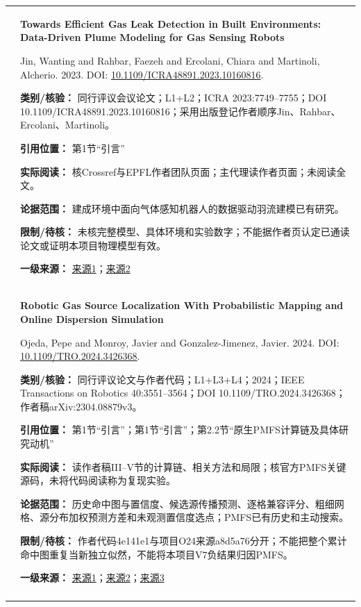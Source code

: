 \begin{longtable}{@{}>{\raggedright\arraybackslash}p{0.7cm}>{\raggedright\arraybackslash}p{14.8cm}@{}}
9 & \textbf{Towards Efficient Gas Leak Detection in Built Environments: Data-Driven Plume Modeling for Gas Sensing Robots}\par Jin, Wanting and Rahbar, Faezeh and Ercolani, Chiara and Martinoli, Alcherio. 2023. DOI: \url{10.1109/ICRA48891.2023.10160816}. \par\textbf{类别/核验：} 同行评议会议论文；L1+L2；ICRA 2023:7749–7755；DOI 10.1109/ICRA48891.2023.10160816；采用出版登记作者顺序Jin、Rahbar、Ercolani、Martinoli。\par\textbf{引用位置：} 第1节“引言”\par\textbf{实际阅读：} 核Crossref与EPFL作者团队页面；主代理读作者页面；未阅读全文。\par\textbf{论据范围：} 建成环境中面向气体感知机器人的数据驱动羽流建模已有研究。\par\textbf{限制/待核：} 未核完整模型、具体环境和实验数字；不能据作者页认定已通读论文或证明本项目物理模型有效。\par\textbf{一级来源：} \href{https://doi.org/10.1109/ICRA48891.2023.10160816}{来源1}；\href{https://www.epfl.ch/labs/disal/research/gassensingstructure/}{来源2} \\\addlinespace[6pt]
10 & \textbf{Robotic Gas Source Localization With Probabilistic Mapping and Online Dispersion Simulation}\par Ojeda, Pepe and Monroy, Javier and Gonzalez-Jimenez, Javier. 2024. DOI: \url{10.1109/TRO.2024.3426368}. \par\textbf{类别/核验：} 同行评议论文与作者代码；L1+L3+L4；2024；IEEE Transactions on Robotics 40:3551–3564；DOI 10.1109/TRO.2024.3426368；作者稿arXiv:2304.08879v3。\par\textbf{引用位置：} 第1节“引言”；第1节“引言”；第2.2节“原生PMFS计算链及具体研究动机”\par\textbf{实际阅读：} 读作者稿III–V节的计算链、相关方法和局限；核官方PMFS关键源码，未将代码阅读称为复现实验。\par\textbf{论据范围：} 历史命中图与置信度、候选源传播预测、逐格兼容评分、粗细网格、源分布加权预测方差和未观测置信度选点；PMFS已有历史和主动搜索。\par\textbf{限制/待核：} 作者代码4e141e1与项目O24来源a8d5a76分开；不能把整个累计命中图重复当新独立似然，不能将本项目V7负结果归因PMFS。\par\textbf{一级来源：} \href{https://arxiv.org/html/2304.08879v3}{来源1}；\href{https://doi.org/10.1109/TRO.2024.3426368}{来源2}；\href{https://github.com/MAPIRlab/GasSourceLocalization}{来源3} \\\addlinespace[6pt]

\end{longtable}
